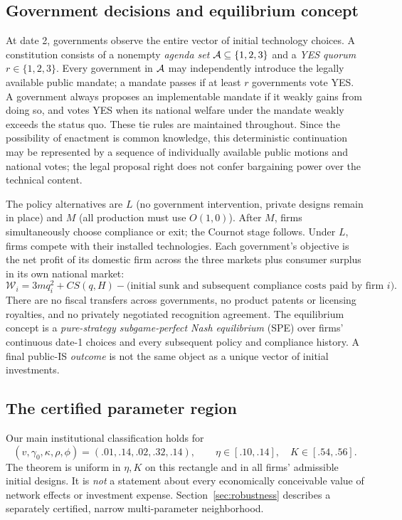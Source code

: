 \subsection{Government decisions and equilibrium concept}\label{subsec:timing}

At date 2, governments observe the entire vector of initial technology choices. A constitution consists of a nonempty \emph{agenda set} \(\mathcal{A}\subseteq\{1,2,3\}\) and a \emph{YES quorum} \(r\in\{1,2,3\}\). Every government in \(\mathcal{A}\) may independently introduce the legally available public mandate; a mandate passes if at least \(r\) governments vote YES. A government always proposes an implementable mandate if it weakly gains from doing so, and votes YES when its national welfare under the mandate weakly exceeds the status quo. These tie rules are maintained throughout. Since the possibility of enactment is common knowledge, this deterministic continuation may be represented by a sequence of individually available public motions and national votes; the legal proposal right does not confer bargaining power over the technical content.

The policy alternatives are \(L\) (no government intervention, private designs remain in place) and \(M\) (all production must use \(O(1,0)\)). After \(M\), firms simultaneously choose compliance or exit; the Cournot stage follows. Under \(L\), firms compete with their installed technologies. Each government's objective is the net profit of its domestic firm across the three markets plus consumer surplus in its own national market:
\begin{equation}
 \mathcal W_i=3m q_i^2+CS(q,H)
 -\bigl(\text{initial sunk and subsequent compliance costs paid by firm }i\bigr).
 \label{eq:government-welfare}
\end{equation}
There are no fiscal transfers across governments, no product patents or licensing royalties, and no privately negotiated recognition agreement. The equilibrium concept is a \emph{pure-strategy subgame-perfect Nash equilibrium} (SPE) over firms' continuous date-1 choices and every subsequent policy and compliance history. A final public-IS \emph{outcome} is not the same object as a unique vector of initial investments.

\subsection{The certified parameter region}\label{subsec:parameters}

Our main institutional classification holds for
\begin{equation}
 (v,\gamma_0,\kappa,\rho,\phi)
 =(.01,.14,.02,.32,.14),\qquad
 \eta\in[.10,.14],\quad K\in[.54,.56].
 \label{eq:baseline-box}
\end{equation}
The theorem is uniform in \(\eta,K\) on this rectangle and in all firms' admissible initial designs. It is \emph{not} a statement about every economically conceivable value of network effects or investment expense. Section~\ref{sec:robustness} describes a separately certified, narrow multi-parameter neighborhood.
